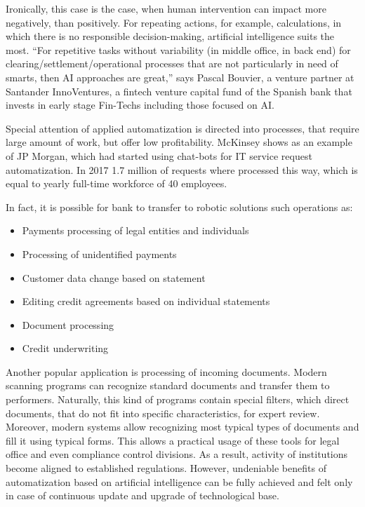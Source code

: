 Ironically, this case is the case, when human intervention can impact more negatively, than positively.
For repeating actions, for example, calculations, in which there is no responsible decision-making, artificial intelligence suits the most.
“For repetitive tasks without variability (in middle office, in back end) for clearing/settlement/operational processes that are not particularly in need of smarts, 
then AI approaches are great,” says Pascal Bouvier, a venture partner at Santander InnoVentures, a fintech venture capital fund of the Spanish bank that invests in early stage Fin-Techs including those focused on AI.
\cite{ai_reality_hype}


Special attention of applied automatization is directed into processes, that require large amount of work, but offer low profitability.
McKinsey shows as an example of JP Morgan, which had started using chat-bots for IT service request automatization.
In 2017 1.7 million of requests where processed this way, which is equal to yearly full-time workforce of 40 employees.
\cite{ways_ai_transforming_bi}


In fact, it is possible for bank to transfer to robotic solutions such operations as:
\begin{itemize}[noitemsep]
    \item Payments processing of legal entities and individuals
    \item Processing of unidentified payments
    \item Customer data change based on statement
    \item Editing credit agreements based on individual statements
    \item Document processing
    \item Credit underwriting
\end{itemize}

Another popular application is processing of incoming documents.
Modern scanning programs can recognize standard documents and transfer them to performers.
Naturally, this kind of programs contain special filters, which direct documents, that do not fit into specific characteristics, for expert review.
Moreover, modern systems allow recognizing most typical types of documents and fill it using typical forms.
This allows a practical usage of these tools for legal office and even compliance control divisions.
As a result, activity of institutions become aligned to established regulations.
However, undeniable benefits of automatization based on artificial intelligence can be fully achieved and felt only in case of continuous update and upgrade of technological base.
\cite{banking_ai_revolution}

